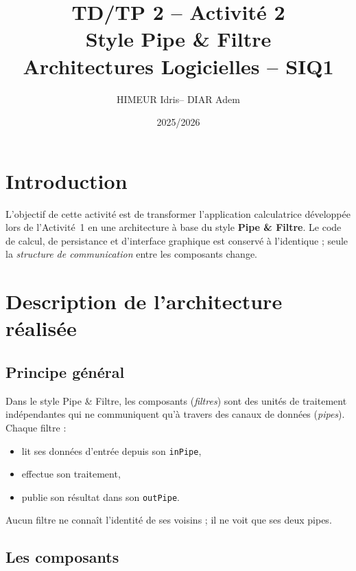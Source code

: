 \documentclass[12pt,a4paper]{article}
\title{
  \vspace{-1cm}
  \textbf{TD/TP 2 -- Activité 2} \\[0.4em]
  \large Style Pipe \& Filtre \\[0.2em]
  \normalsize Architectures Logicielles -- SIQ1
}
\author{HIMEUR Idris-- DIAR Adem}
\date{2025/2026}
\begin{document}
\maketitle
\tableofcontents
\newpage

\section{Introduction}

L'objectif de cette activité est de transformer l'application calculatrice développée
lors de l'Activité~1 en une architecture à base du style \textbf{Pipe \& Filtre}.
Le code de calcul, de persistance et d'interface graphique est conservé à l'identique ;
seule la \emph{structure de communication} entre les composants change.

\section{Description de l'architecture réalisée}

\subsection{Principe général}

Dans le style Pipe \& Filtre, les composants (\emph{filtres}) sont des unités de
traitement indépendantes qui ne communiquent qu'à travers des canaux de données
(\emph{pipes}). Chaque filtre :
\begin{itemize}
  \item lit ses données d'entrée depuis son \texttt{inPipe},
  \item effectue son traitement,
  \item publie son résultat dans son \texttt{outPipe}.
\end{itemize}

Aucun filtre ne connaît l'identité de ses voisins ; il ne voit que ses deux pipes.

\subsection{Les composants}
\end{document}
